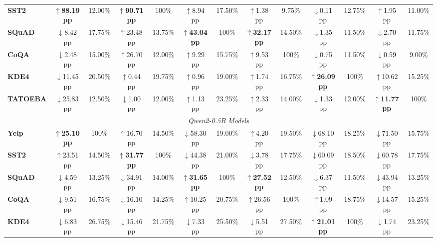 \begin{table}[htb]
{\begin{tabular}{|l|cc|cc|cc|cc|cc|cc|}
\textbf{SST2} & \textbf{$\uparrow$88.19\,pp} & 12.00\% & \textbf{$\uparrow$90.71\,pp} & 100\% & $\uparrow$8.94\,pp & 17.50\% & $\uparrow$1.38\,pp & 9.75\% & $\downarrow$0.11\,pp & 12.75\% & $\uparrow$1.95\,pp & 11.00\% \\
\textbf{SQuAD} & $\downarrow$8.42\,pp & 17.75\% & $\uparrow$23.48\,pp & 13.75\% & \textbf{$\uparrow$43.04\,pp} & 100\% & \textbf{$\uparrow$32.17\,pp} & 14.50\% & $\downarrow$1.35\,pp & 11.50\% & $\downarrow$2.70\,pp & 11.75\% \\
\textbf{CoQA} & $\downarrow$2.48\,pp & 15.00\% & $\uparrow$26.70\,pp & 12.00\% & $\uparrow$9.29\,pp & 15.75\% & $\uparrow$9.53\,pp & 100\% & $\downarrow$0.75\,pp & 11.50\% & $\downarrow$0.59\,pp & 9.00\% \\
\textbf{KDE4} & $\downarrow$11.45\,pp & 20.50\% & $\uparrow$0.44\,pp & 19.75\% & $\uparrow$0.96\,pp & 19.00\% & $\uparrow$1.74\,pp & 16.75\% & \textbf{$\uparrow$26.09\,pp} & 100\% & $\uparrow$10.62\,pp & 15.25\% \\
\textbf{TATOEBA} & $\downarrow$25.83\,pp & 12.50\% & $\downarrow$1.00\,pp & 12.00\% & $\uparrow$1.13\,pp & 23.25\% & $\uparrow$2.33\,pp & 14.00\% & $\downarrow$1.33\,pp & 12.00\% & \textbf{$\uparrow$11.77\,pp} & 100\% \\
\hline
\hline
\multicolumn{13}{|c|}{\textit{Qwen2-0.5B Models}} \\
\hline
\textbf{Yelp} & \textbf{$\uparrow$25.10\,pp} & 100\% & $\uparrow$16.70\,pp & 14.50\% & $\downarrow$58.30\,pp & 19.00\% & $\uparrow$4.20\,pp & 19.50\% & $\downarrow$68.10\,pp & 18.25\% & $\downarrow$71.50\,pp & 15.75\% \\
\textbf{SST2} & $\uparrow$23.51\,pp & 14.50\% & \textbf{$\uparrow$31.77\,pp} & 100\% & $\downarrow$44.38\,pp & 21.00\% & $\downarrow$3.78\,pp & 17.75\% & $\downarrow$60.09\,pp & 18.50\% & $\downarrow$60.78\,pp & 17.75\% \\
\textbf{SQuAD} & $\downarrow$4.59\,pp & 13.25\% & $\downarrow$34.91\,pp & 14.00\% & \textbf{$\uparrow$31.65\,pp} & 100\% & \textbf{$\uparrow$27.52\,pp} & 12.50\% & $\downarrow$6.37\,pp & 11.50\% & $\downarrow$43.94\,pp & 13.25\% \\
\textbf{CoQA} & $\downarrow$9.51\,pp & 16.75\% & $\downarrow$16.10\,pp & 14.25\% & $\uparrow$10.25\,pp & 20.75\% & $\uparrow$26.56\,pp & 100\% & $\uparrow$1.09\,pp & 18.75\% & $\downarrow$14.57\,pp & 15.25\% \\
\textbf{KDE4} & $\downarrow$6.83\,pp & 26.75\% & $\downarrow$15.46\,pp & 21.75\% & $\downarrow$7.33\,pp & 25.50\% & $\downarrow$5.51\,pp & 27.50\% & \textbf{$\uparrow$21.01\,pp} & 100\% & $\downarrow$1.74\,pp & 23.25\% \\

\end{tabular}}
\end{table}
